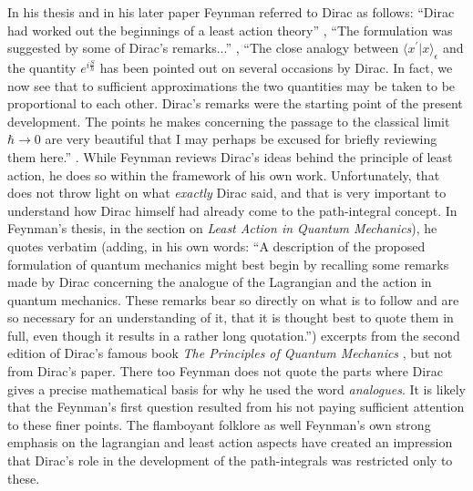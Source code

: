 \documentclass[12pt]{article}
\begin{document}
In his thesis \cite{thesis} and in his later paper \cite{feynpaper} Feynman referred to Dirac as follows: ``Dirac had worked out the beginnings
of a least action theory'' \cite{thesis}, ``The formulation was suggested by some of Dirac's remarks...'' \cite{feynpaper}, ``The close analogy
between $\langle x^\prime|x\rangle_{\epsilon}$ and the quantity $e^{i\frac{S}{\hbar}}$ has been pointed out on several occasions by Dirac. In
fact, we now see that to sufficient approximations the two quantities may be taken to be proportional to each other. Dirac's remarks were the starting point of the present development. The points he makes concerning the passage to the classical limit $\hbar \rightarrow 0$ are very
beautiful that I may perhaps be excused for briefly reviewing them here.'' \cite{feynpaper}. While Feynman reviews Dirac's ideas behind the principle
of least action, he does so within the framework of his own work. Unfortunately, that does not throw light on what {\it exactly} Dirac said, and
that is very important to understand how Dirac himself had already come to the path-integral concept. In Feynman's thesis, in the section on {\it Least Action in Quantum Mechanics}), he quotes verbatim (adding, in his own words:
``A description of the proposed formulation of quantum mechanics
might best begin by recalling some remarks made by Dirac concerning
the analogue of the Lagrangian and the action in quantum
mechanics. These remarks bear so directly on what is to follow and
are so necessary for an understanding of it, that it is thought best to
quote them in full, even though it results in a rather long quotation.'')
excerpts from the second edition of Dirac's famous book {\it The Principles of Quantum Mechanics} \cite{diracbook2}, but not from Dirac's paper.
There too Feynman  does not quote the parts where Dirac gives a precise mathematical basis for why he used the word \emph{analogues}. 
It is likely that the Feynman's first question resulted from  his not paying sufficient attention to these finer points. The flamboyant
folklore as well Feynman's own strong emphasis on the lagrangian and least action aspects have created an impression that Dirac's role in the 
development of the path-integrals was restricted only to these.
\end{document}
